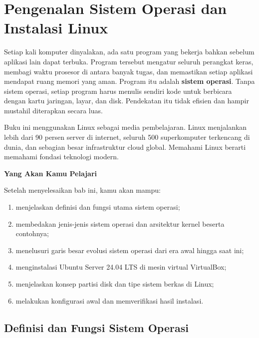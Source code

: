 
\chapter{Pengenalan Sistem Operasi dan Instalasi Linux}
\label{ch:introduction}

Setiap kali komputer dinyalakan, ada satu program yang bekerja bahkan sebelum aplikasi
lain dapat terbuka. Program tersebut mengatur seluruh perangkat keras, membagi waktu
prosesor di antara banyak tugas, dan memastikan setiap aplikasi mendapat ruang memori
yang aman. Program itu adalah \textbf{sistem operasi}. Tanpa sistem operasi, setiap
program harus menulis sendiri kode untuk berbicara dengan kartu jaringan, layar, dan
disk. Pendekatan itu tidak efisien dan hampir mustahil diterapkan secara luas.

Buku ini menggunakan Linux sebagai media pembelajaran. Linux menjalankan lebih dari 90
persen server di internet, seluruh 500 superkomputer terkencang di dunia, dan sebagian
besar infrastruktur cloud global. Memahami Linux berarti memahami fondasi teknologi
modern.

\textbf{Yang Akan Kamu Pelajari}

Setelah menyelesaikan bab ini, kamu akan mampu:

\begin{enumerate}
    \item menjelaskan definisi dan fungsi utama sistem operasi;
    \item membedakan jenis-jenis sistem operasi dan arsitektur kernel beserta contohnya;
    \item menelusuri garis besar evolusi sistem operasi dari era awal hingga saat ini;
    \item menginstalasi Ubuntu Server 24.04 LTS di mesin virtual VirtualBox;
    \item menjelaskan konsep partisi disk dan tipe sistem berkas di Linux;
    \item melakukan konfigurasi awal dan memverifikasi hasil instalasi.
\end{enumerate}

\section{Definisi dan Fungsi Sistem Operasi}
\label{sec:os-basics}

